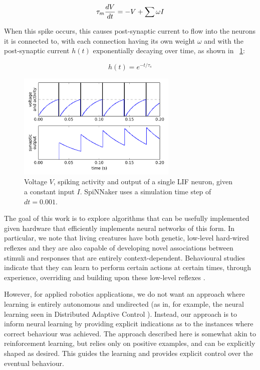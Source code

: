 \documentclass[conference]{IEEEtran}
\begin{document}
\begin{equation}
    \tau_m {dV \over dt} = -V + \sum \omega I
\end{equation}

When this spike occurs, this causes post-synaptic current to flow into the 
neurons it is connected to, with each connection having its own weight $\omega$
and with the post-synaptic current $h(t)$ exponentially decaying over time, 
as shown in \figurename~\ref{Neuron}:

\begin{equation}
    h(t) = e^{-t/\tau_s}
\end{equation}

\begin{figure}[!t]
\centering
\includegraphics[width=3in]{neuron.png}
\caption{Voltage $V$, spiking activity and output of a single LIF neuron, given a constant input $I$.
SpiNNaker uses a simulation time step of $dt=0.001$.}
\label{Neuron}
\end{figure}

The goal of this work is to explore algorithms that can be usefully implemented
given hardware that efficiently implements neural networks of this form.  In
particular, we note that living creatures have both genetic, low-level 
hard-wired reflexes and they are also capable of developing novel associations 
between stimuli and responses that are entirely context-dependent. Behavioural 
studies indicate that they can learn to perform certain actions at certain 
times, through experience, overriding and building upon these low-level 
reflexes \cite{kim2007encoding}. 

However, for applied robotics applications, we do not want an approach where
learning is entirely autonomous and undirected (as in, for example, the neural
learning seen in Distributed Adaptive Control \cite{verschure2012distributed}). 
Instead, our approach is to inform neural learning by providing explicit
indications as to the instances where correct behaviour was achieved.  The 
approach described here is somewhat akin to reinforcement learning, but relies
only on positive examples, and can be explicitly shaped as desired.  This 
guides the learning and provides explicit control over the eventual behaviour. 
\end{document}
